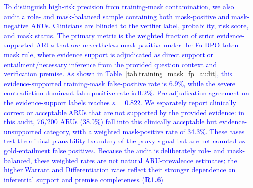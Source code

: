 \documentclass[a4paper,fleqn,doubleblind]{cas-sc}
\DeclareRobustCommand{\added}[1]{\textcolor{blue}{#1}}
\DeclareRobustCommand{\revtag}[1]{\textcolor{blue}{\scriptsize\,(\textbf{#1})}}
\begin{document}
\added{To distinguish high-risk precision from training-mask contamination, we also audit a role- and mask-balanced sample containing both mask-positive and mask-negative ARUs. Clinicians are blinded to the verifier label, probability, risk score, and mask status. The primary metric is the weighted fraction of strict evidence-supported ARUs that are nevertheless mask-positive under the Fa-DPO token-mask rule, where evidence support is adjudicated as direct support or entailment/necessary inference from the provided question context and verification premise. As shown in Table~\ref{tab:training_mask_fp_audit}, this evidence-supported training-mask false-positive rate is 6.9\%, while the severe contradiction-dominant false-positive rate is 0.2\%. Pre-adjudication agreement on the evidence-support labels reaches $\kappa=0.822$. We separately report clinically correct or acceptable ARUs that are not supported by the provided evidence: in this audit, 76/200 ARUs (38.0\%) fall into this clinically acceptable but evidence-unsupported category, with a weighted mask-positive rate of 34.3\%. These cases test the clinical plausibility boundary of the proxy signal but are not counted as gold-entailment false positives. Because the audit is deliberately role- and mask-balanced, these weighted rates are not natural ARU-prevalence estimates; the higher Warrant and Differentiation rates reflect their stronger dependence on inferential support and premise completeness.}\revtag{R1.6}
\end{document}
